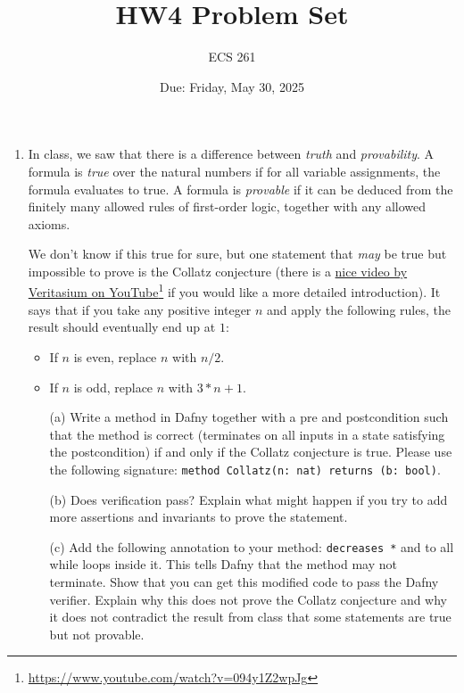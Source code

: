 \documentclass{article}
\newcommand{\visiblehref}[2]{\href{#1}{#2}\footnote{\url{#1}}}
\begin{document}
\title{HW4 Problem Set}
\author{ECS 261}
\date{Due: Friday, May 30, 2025}

\maketitle

\begin{enumerate}
\item
In class, we saw that there is a difference between
\emph{truth} and \emph{provability}. A formula is \emph{true} over the natural numbers
if for all variable assignments, the formula evaluates to true.
A formula is \emph{provable} if it can be deduced from the finitely many allowed
rules of first-order logic, together with any allowed axioms.

We don't know if this true for sure, but one statement that \emph{may} be true but impossible to prove is the Collatz conjecture
(there is a \visiblehref{https://www.youtube.com/watch?v=094y1Z2wpJg}{nice video by Veritasium on YouTube} if you would like a more detailed introduction).
It says that if you take any positive integer $n$ and apply the following rules, the result should eventually end up at $1$:
\begin{itemize}
\item If $n$ is even, replace $n$ with $n / 2$.
\item If $n$ is odd, replace $n$ with $3 * n + 1$.
\end{itemize}

\begin{enumerate}
\item[(a)]
Write a method in Dafny together with a pre and postcondition
such that the method is correct (terminates on all inputs in a state satisfying the postcondition)
if and only if the Collatz conjecture is true. Please use the following signature: \texttt{method Collatz(n: nat) returns (b: bool)}.

\item[(b)]
Does verification pass?
Explain what might happen if you try to add more assertions and invariants to prove the statement.

\item[(c)]
Add the following annotation to your method:
\texttt{decreases *} and to all while loops inside it.
This tells Dafny that the method may not terminate.
Show that you can get this modified code to pass the Dafny verifier.
Explain why this does not prove the Collatz conjecture and why it does not contradict the result from class that some statements are true but not provable.


\end{enumerate}
\end{enumerate}
\end{document}
